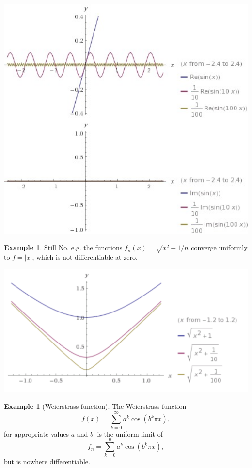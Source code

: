 \documentclass[12pt]{article}
\theoremstyle{plain}
\theoremstyle{definition}
\newtheorem{example}[theorem]{Example}
\theoremstyle{remark}
\begin{document}
\centerline{\includegraphics[width=1.0\textwidth]{uniformconvergence1}}

\begin{example}
Still No, e.g. the functions $f_n(x) = \sqrt{x^2 + 1/n}$ converge uniformly to $f = |x|$, which is not differentiable at zero.
\end{example}

\centerline{\includegraphics[width=1.0\textwidth]{uniformconvergence2}}

\begin{example}[Weierstrass function]
The Weierstrass function $$f(x) = \sum^\infty_{k=0} a^k \cos(b^k \pi x),$$ for appropriate values $a$ and $b$, is the uniform limit of $$f_n = \sum^n_{k=0} a^k \cos(b^k \pi x),$$ but is nowhere differentiable.
\end{example}
\end{document}
